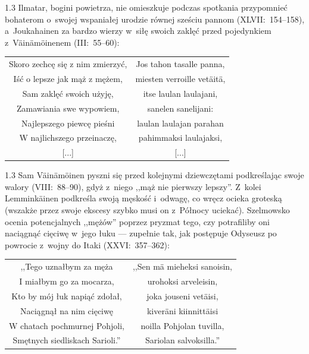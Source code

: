 \documentclass[11pt,a4paper,twoside]{report}
\begin{document}
\begin{spacing}{1.3}
Ilmatar, bogini powietrza, nie omieszkuje podczas spotkania przypomnieć bohaterom o~swojej wspaniałej urodzie równej sześciu pannom (XLVII:~154--158), a~Joukahainen za bardzo wierzy w~siłę swoich zaklęć przed pojedynkiem z~Väinämöinenem (III:~55--60):
\end{spacing}
{\centering
\small
\begin{longtable}{c c}
Skoro zechcę się z nim zmierzyć, & Jos tahon tasalle panna,\\
Iść o lepsze jak mąż z mężem, & miesten verroille vetäitä,\\
Sam zaklęć swoich użyję, & itse laulan laulajani,\\
Zamawiania swe wypowiem, & sanelen sanelijani:\\
Najlepszego piewcę pieśni & laulan laulajan parahan\\
W najlichszego przeinaczę, & pahimmaksi laulajaksi,\\
{[...]} & {[...]}\\
\end{longtable}
}
\begin{spacing}{1.3}
Sam Väinämöinen pyszni się przed kolejnymi dziewczętami podkreślając swoje walory (VIII:~88--90), gdyż z~niego ,,mąż nie pierwszy lepszy''. Z~kolei Lemminkäinen podkreśla swoją męskość i~odwagę, co wręcz ocieka groteską (wszakże przez swoje ekscesy szybko musi on z~Północy uciekać). Szelmowsko ocenia potencjalnych ,,mężów'' poprzez pryzmat tego, czy potrafiliby oni naciągnąć cięciwę w~jego łuku --- zupełnie tak, jak postępuje Odyseusz po powrocie z~wojny do Itaki (XXVI:~357--362):
\end{spacing}
\newpage
{\centering
\small
\begin{longtable}{c c}
,,Tego uznałbym za męża & ,,Sen mä mieheksi sanoisin,\\
I miałbym go za mocarza, & urohoksi arveleisin,\\
Kto by mój łuk napiąć zdołał, & joka jouseni vetäisi,\\
Naciągnął na nim cięciwę & kiveräni kiinnittäisi\\
W chatach pochmurnej Pohjoli, & noilla Pohjolan tuvilla,\\
Smętnych siedliskach Sarioli.'' & Sariolan salvoksilla.''\\
\end{longtable}
}
\vspace{1\baselineskip}
\end{document}

